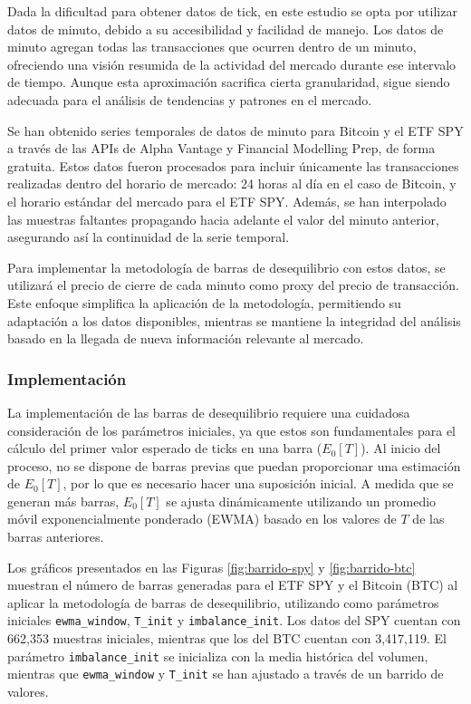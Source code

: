 \documentclass[a4paper,12pt, twoside]{report}
\begin{document}
Dada la dificultad para obtener datos de tick, en este estudio se opta por utilizar datos de minuto, debido a su accesibilidad 
y facilidad de manejo. Los datos de minuto agregan todas las transacciones que ocurren dentro de un minuto, ofreciendo una 
visión resumida de la actividad del mercado durante ese intervalo de tiempo. Aunque esta aproximación sacrifica cierta 
granularidad, sigue siendo adecuada para el análisis de tendencias y patrones en el mercado.

Se han obtenido series temporales de datos de minuto para Bitcoin y el ETF SPY a través de las APIs de Alpha Vantage y 
Financial Modelling Prep, de forma gratuita. Estos datos fueron procesados para incluir únicamente las transacciones 
realizadas dentro del horario de mercado: 24 horas al día en el caso de Bitcoin, y el horario estándar del mercado para 
el ETF SPY. Además, se han interpolado las muestras faltantes propagando hacia adelante el valor del minuto anterior, 
asegurando así la continuidad de la serie temporal.

Para implementar la metodología de barras de desequilibrio con estos datos, se utilizará el precio de cierre de cada minuto 
como proxy del precio de transacción. Este enfoque simplifica la aplicación de la metodología, permitiendo su adaptación a 
los datos disponibles, mientras se mantiene la integridad del análisis basado en la llegada de nueva información relevante 
al mercado.
\subsubsection{Implementación}
La implementación de las barras de desequilibrio requiere una cuidadosa consideración de los parámetros iniciales, 
ya que estos son fundamentales para el cálculo del primer valor esperado de ticks en una barra (\(E_0[T]\)). Al inicio 
del proceso, no se dispone de barras previas que puedan proporcionar una estimación de \(E_0[T]\), por lo que es necesario 
hacer una suposición inicial. A medida que se generan más barras, \(E_0[T]\) se ajusta dinámicamente utilizando un promedio móvil exponencialmente 
ponderado (EWMA) basado en los valores de \(T\) de las barras anteriores.

Los gráficos presentados en las Figuras \ref{fig:barrido-spy} y \ref{fig:barrido-btc} muestran el número de barras 
generadas para el ETF SPY y el Bitcoin (BTC) al aplicar la metodología de barras de desequilibrio, utilizando como 
parámetros iniciales \texttt{ewma\_window}, \texttt{T\_init} y \texttt{imbalance\_init}. Los datos del SPY cuentan 
con 662,353 muestras iniciales, mientras que los del BTC cuentan con 3,417,119. El parámetro \texttt{imbalance\_init} 
se inicializa con la media histórica del volumen, mientras que \texttt{ewma\_window} y \texttt{T\_init} se han ajustado 
a través de un barrido de valores. 
\end{document}
